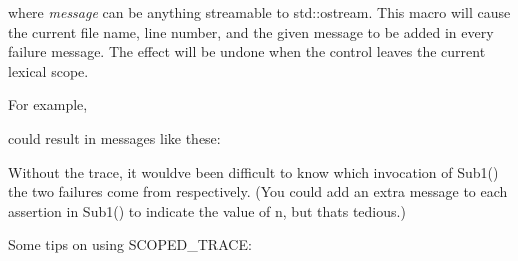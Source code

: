 where {\itshape message} can be anything streamable to {\ttfamily std\+::ostream}. This macro will cause the current file name, line number, and the given message to be added in every failure message. The effect will be undone when the control leaves the current lexical scope.

For example,


\begin{DoxyCode}{0}
\end{DoxyCode}


could result in messages like these\+:


\begin{DoxyCode}{0}
\DoxyCodeLine{}
\end{DoxyCode}


Without the trace, it would\textquotesingle{}ve been difficult to know which invocation of {\ttfamily Sub1()} the two failures come from respectively. (You could add an extra message to each assertion in {\ttfamily Sub1()} to indicate the value of {\ttfamily n}, but that\textquotesingle{}s tedious.)

Some tips on using {\ttfamily S\+C\+O\+P\+E\+D\+\_\+\+T\+R\+A\+CE}\+:


